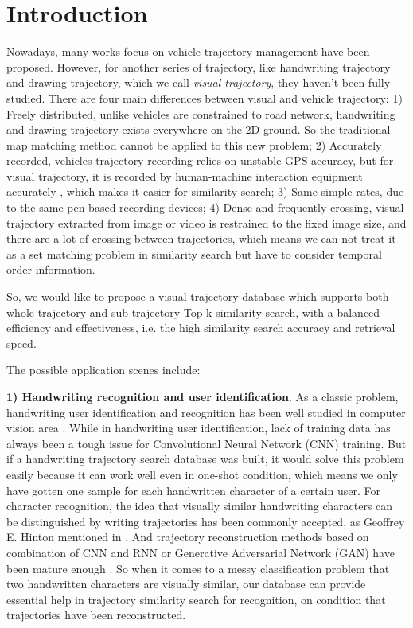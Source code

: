 \documentclass[sigconf]{acmart}
\begin{document}
\maketitle

\section{Introduction}
Nowadays, many works focus on vehicle trajectory management have been proposed. However, for another series of trajectory, like handwriting trajectory and drawing trajectory, which we call \textit{visual trajectory}, they haven't been fully studied. There are four main differences between visual and vehicle trajectory: 1) Freely distributed, unlike vehicles are constrained to road network, handwriting and drawing trajectory exists everywhere on the 2D ground. So the traditional map matching method \cite{Wang2018} cannot be applied to this new problem; 2) Accurately recorded, vehicles trajectory recording relies on unstable GPS accuracy, but for visual trajectory, it is recorded by human-machine interaction equipment accurately \cite{VikramLR13}, which makes it easier for similarity search; 3) Same simple rates, due to the same pen-based recording devices; 4) Dense and frequently crossing, visual trajectory extracted from image or video is restrained to the fixed image size, and there are a lot of crossing between trajectories, which means we can not treat it as a set matching problem in similarity search but have to consider temporal order information. 

So, we would like to propose a visual trajectory database which supports both whole trajectory and sub-trajectory Top-k similarity search, with a balanced efficiency and effectiveness, i.e. the high similarity search accuracy and retrieval speed. 

The possible application scenes include: 

\noindent
\textbf{1) Handwriting recognition and user identification}. As a classic problem, handwriting user identification and recognition has been well studied in computer vision area \cite{WangL17, eccv/WigingtonTDBPC18}. While in handwriting user identification, lack of training data has always been a tough issue for Convolutional Neural Network (CNN) training. But if a handwriting trajectory search database was built, it would solve this problem easily because it can work well even in one-shot condition, which means we only have gotten one sample for each handwritten character of a certain user. For character recognition, the idea that visually similar handwriting characters can be distinguished by writing trajectories has been commonly accepted, as Geoffrey E. Hinton mentioned in \cite{HintonN05}. And trajectory reconstruction methods based on combination of CNN and RNN or Generative Adversarial Network (GAN) have been mature enough \cite{ICPRtraj, GuptaJFSA18}. So when it comes to a messy classification problem that two handwritten characters are visually similar, our database can provide essential help in trajectory similarity search for recognition, on condition that trajectories have been reconstructed. 
\end{document}
